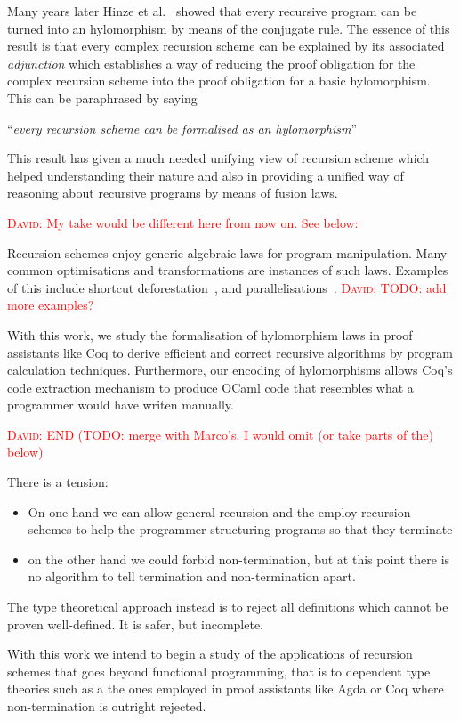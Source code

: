 \documentclass{article}
\newcommand{\dcas}[1]{\textcolor{red}{\textsc{David}: #1}}
\begin{document}
Many years later Hinze et al.~\cite{HinzeWG15} showed that every recursive
program can be turned into an hylomorphism by means of the conjugate rule. The
essence of this result is that every complex recursion scheme can be explained
by its associated \emph{adjunction} which establishes a way of reducing the
proof obligation for the complex recursion scheme into the proof obligation for
a basic hylomorphism. This can be paraphrased by saying
\begin{center}
  ``\emph{every recursion scheme can be formalised as an hylomorphism}''
\end{center}

This result has given a much needed unifying view of recursion scheme which
helped understanding their nature and also in providing a unified way of
reasoning about recursive programs by means of fusion laws.

\dcas{My take would be different here from now on. See below:}

Recursion schemes enjoy generic algebraic laws for program manipulation. Many
common optimisations and transformations are instances of such laws. Examples of
this include shortcut deforestation~\cite{TakanoM95}, and
parallelisations~\cite{Gibbons96:Third}. \dcas{TODO: add more examples?}

With this work, we study the formalisation of hylomorphism laws in proof
assistants like Coq to derive efficient and correct recursive algorithms by
program calculation techniques. Furthermore, our encoding of hylomorphisms
allows Coq's code extraction mechanism to produce OCaml code that resembles what
a programmer would have writen manually.

\dcas{END (TODO: merge with Marco's. I would omit (or take parts of the) below)}

There is a tension:
\begin{itemize}
  \item On one hand we can allow general recursion and the employ recursion
schemes to help the programmer structuring programs so that they terminate
  \item on the other hand we could forbid non-termination, but at this point
there is no algorithm to tell termination and non-termination apart.
\end{itemize}

The type theoretical approach instead is to reject all definitions which cannot
be proven well-defined. It is safer, but incomplete.

With this work we intend to begin a study of the applications of recursion
schemes that goes beyond functional programming, that is to dependent type
theories such as a the ones employed in proof assistants like Agda or Coq where
non-termination is outright rejected.
\end{document}
